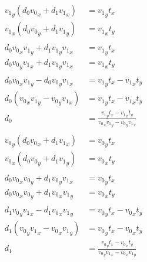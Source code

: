 \documentclass{article}
\begin{document}
\begin{align*}
    {v_1}_y \left( d_0 {v_0}_x + d_1 {v_1}_x \right)     & = {v_1}_y t_x                                                         \\
    {v_1}_x \left( d_0 {v_0}_y + d_1 {v_1}_y \right)     & = {v_1}_x t_y                                                         \\
    \\
    d_0 {v_0}_x {v_1}_y + d_1 {v_1}_y {v_1}_x            & = {v_1}_y t_x                                                         \\
    d_0 {v_0}_y {v_1}_x + d_1 {v_1}_y {v_1}_x            & = {v_1}_x t_y                                                         \\
    \\
    d_0 {v_0}_x {v_1}_y - d_0 {v_0}_y {v_1}_x            & = {v_1}_y t_x - {v_1}_x t_y                                           \\
    d_0 \left( {v_0}_x {v_1}_y - {v_0}_y {v_1}_x \right) & = {v_1}_y t_x - {v_1}_x t_y                                           \\
    d_0                                                  & = \frac{{v_1}_y t_x - {v_1}_x t_y}{{v_0}_x {v_1}_y - {v_0}_y {v_1}_x} \\
    \\
    {v_0}_y \left( d_0 {v_0}_x + d_1 {v_1}_x \right)     & = {v_0}_y t_x                                                         \\
    {v_0}_x \left( d_0 {v_0}_y + d_1 {v_1}_y \right)     & = {v_0}_x t_y                                                         \\
    \\
    d_0 {v_0}_x {v_0}_y + d_1 {v_0}_y {v_1}_x            & = {v_0}_y t_x                                                         \\
    d_0 {v_0}_x {v_0}_y + d_1 {v_0}_x {v_1}_y            & = {v_0}_x t_y                                                         \\
    \\
    d_1 {v_0}_y {v_1}_x - d_1 {v_0}_x {v_1}_y            & = {v_0}_y t_x - {v_0}_x t_y                                           \\
    d_1 \left( {v_0}_y {v_1}_x - {v_0}_x {v_1}_y \right) & = {v_0}_y t_x - {v_0}_x t_y                                           \\
    d_1                                                  & = \frac{{v_0}_y t_x - {v_0}_x t_y}{{v_0}_y {v_1}_x - {v_0}_x {v_1}_y} \\
\end{align*}
\end{document}

